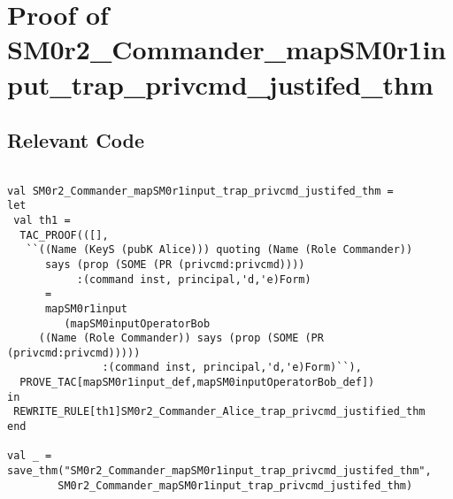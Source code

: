 \documentclass{report}
\begin{document}
\section{Proof of SM0r2_Commander_mapSM0r1input_trap_privcmd_justifed_thm}
\label{proof-3}

\subsection{Relevant Code}
\label{rel-code-3}
\begin{lstlisting}[frame=TBlr]

val SM0r2_Commander_mapSM0r1input_trap_privcmd_justifed_thm =
let
 val th1 =
  TAC_PROOF(([],
   ``((Name (KeyS (pubK Alice))) quoting (Name (Role Commander))
      says (prop (SOME (PR (privcmd:privcmd))))
           :(command inst, principal,'d,'e)Form)
      =
      mapSM0r1input
         (mapSM0inputOperatorBob
	 ((Name (Role Commander)) says (prop (SOME (PR (privcmd:privcmd)))))
	           :(command inst, principal,'d,'e)Form)``),
  PROVE_TAC[mapSM0r1input_def,mapSM0inputOperatorBob_def])
in
 REWRITE_RULE[th1]SM0r2_Commander_Alice_trap_privcmd_justified_thm
end

val _ = save_thm("SM0r2_Commander_mapSM0r1input_trap_privcmd_justifed_thm",
        SM0r2_Commander_mapSM0r1input_trap_privcmd_justifed_thm)



\end{lstlisting}
\end{document}
